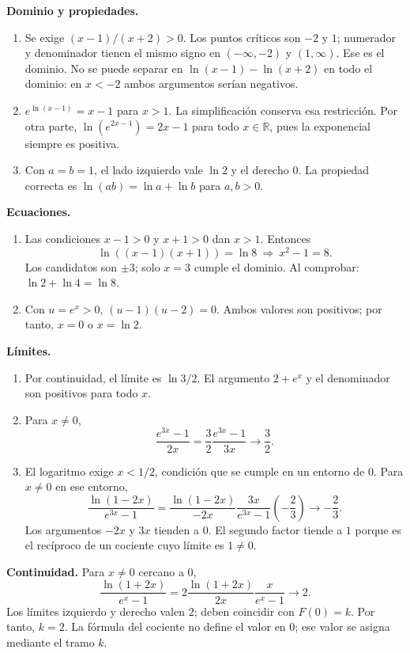 \documentclass[10pt,a5paper]{article}
\begin{document}
\textbf{Dominio y propiedades.}
\begin{enumerate}
  \item Se exige $(x-1)/(x+2)>0$. Los puntos críticos son $-2$ y $1$; numerador y denominador tienen el mismo signo en $(-\infty,-2)$ y $(1,\infty)$. Ese es el dominio. No se puede separar en $\ln(x-1)-\ln(x+2)$ en todo el dominio: en $x<-2$ ambos argumentos serían negativos.
  \item $e^{\ln(x-1)}=x-1$ para $x>1$. La simplificación conserva esa restricción. Por otra parte, $\ln(e^{2x-1})=2x-1$ para todo $x\in\mathbb R$, pues la exponencial siempre es positiva.
  \item Con $a=b=1$, el lado izquierdo vale $\ln2$ y el derecho $0$. La propiedad correcta es $\ln(ab)=\ln a+\ln b$ para $a,b>0$.
\end{enumerate}

\textbf{Ecuaciones.}
\begin{enumerate}
  \item Las condiciones $x-1>0$ y $x+1>0$ dan $x>1$. Entonces
  \[
    \ln((x-1)(x+1))=\ln8
    \ \Longrightarrow\ x^2-1=8.
  \]
  Los candidatos son $\pm3$; solo $x=3$ cumple el dominio. Al comprobar: $\ln2+\ln4=\ln8$.
  \item Con $u=e^x>0$, $(u-1)(u-2)=0$. Ambos valores son positivos; por tanto, $x=0$ o $x=\ln2$.
\end{enumerate}

\textbf{Límites.}
\begin{enumerate}
  \item Por continuidad, el límite es $\ln3/2$. El argumento $2+e^x$ y el denominador son positivos para todo $x$.
  \item Para $x\ne0$,
  \[
    \frac{e^{3x}-1}{2x}=\frac32\frac{e^{3x}-1}{3x}
    \longrightarrow\frac32.
  \]
  \item El logaritmo exige $x<1/2$, condición que se cumple en un entorno de $0$. Para $x\ne0$ en ese entorno,
  \[
    \frac{\ln(1-2x)}{e^{3x}-1}
    =\frac{\ln(1-2x)}{-2x}
     \frac{3x}{e^{3x}-1}\left(-\frac23\right)
    \longrightarrow-\frac23.
  \]
  Los argumentos $-2x$ y $3x$ tienden a $0$. El segundo factor tiende a $1$ porque es el recíproco de un cociente cuyo límite es $1\ne0$.
\end{enumerate}

\textbf{Continuidad.} Para $x\ne0$ cercano a $0$,
\[
 \frac{\ln(1+2x)}{e^x-1}
 =2\frac{\ln(1+2x)}{2x}\frac{x}{e^x-1}
 \longrightarrow2.
\]
Los límites izquierdo y derecho valen $2$; deben coincidir con $F(0)=k$. Por tanto, $k=2$. La fórmula del cociente no define el valor en $0$; ese valor se asigna mediante el tramo $k$.
\end{document}
